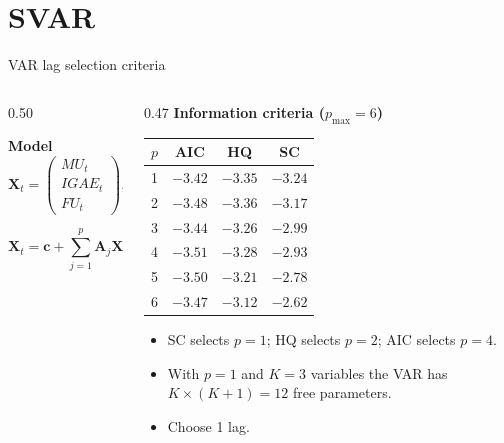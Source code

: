 \documentclass[handout,aspectratio=169,11pt,xcolor={dvipsnames},hyperref={pdftex,pdfpagemode=UseNone,hidelinks,pdfdisplaydoctitle=true},usepdftitle=false]{beamer}
\begin{document}
\section{SVAR}
\begin{frame}{VAR lag selection criteria}

\begin{columns}[T]

\begin{column}{0.50\textwidth}

\textbf{Model}
\[
\mathbf{X}_t = \begin{pmatrix} MU_t \\ IGAE_t \\ FU_t \end{pmatrix}, \qquad
\]

\[
\mathbf{X}_t = \mathbf{c} + \sum_{j=1}^{p} \mathbf{A}_j \mathbf{X}_{t-j} + \mathbf{u}_t
\]





\end{column}

\begin{column}{0.47\textwidth}
\small\textbf{Information criteria ($p_{\max} = 6$)}

\vspace{1mm}
\small
\begin{tabular}{cccc}
\hline
$p$ & \textbf{AIC} & \textbf{HQ} & \textbf{SC}  \\
\hline
1 & $-3.42$ & $-3.35$ & $\mathbf{-3.24}$  \\
2 & $-3.48$ & $\mathbf{-3.36}$ & $-3.17$  \\
3 & $-3.44$ & $-3.26$ & $-2.99$  \\
4 & $\mathbf{-3.51}$ & $-3.28$ & $-2.93$  \\
5 & $-3.50$ & $-3.21$ & $-2.78$  \\
6 & $-3.47$ & $-3.12$ & $-2.62$  \\
\hline
\end{tabular}

\begin{itemize}

  \item SC selects $p = 1$; HQ selects $p = 2$; AIC selects $p = 4$.
       

  \vspace{2mm}


  \item With $p = 1$ and $K = 3$ variables the VAR has
        $K \times (K + 1) = 12$ free parameters.
\item Choose 1 lag. 
\end{itemize}

\end{column}
\end{columns}


\end{frame}
\end{document}
